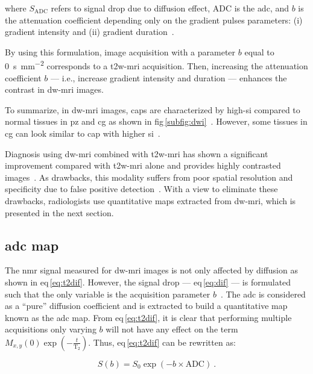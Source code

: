 \noindent where $S_{\text{ADC}}$ refers to signal drop due to diffusion effect,
$\text{ADC}$ is the \acl{adc}, and $b$ is the attenuation coefficient depending
only on the gradient pulses parameters: (i) gradient intensity and (ii)
gradient duration~\cite{LeBihan1986}.

By using this formulation, image acquisition with a parameter $b$ equal to
\SI{0}{\second\per\milli\metre\squared} corresponds to a \ac{t2w}-\ac{mri}
acquisition.
Then, increasing the attenuation coefficient $b$ --- i.e., increase gradient
intensity and duration --- enhances the contrast in \ac{dw}-\ac{mri} images.

To summarize, in \ac{dw}-\ac{mri} images, \acp{cap} are characterized by
high-\ac{si} compared to normal tissues in \ac{pz} and \ac{cg} as shown in
\acs{fig}\,\ref{subfig:dwi}~\cite{Barentsz2012}.
However, some tissues in \ac{cg} can look similar to \ac{cap} with higher
\ac{si}~\cite{Barentsz2012}.

Diagnosis using \ac{dw}-\ac{mri} combined with \ac{t2w}-\ac{mri} has shown a
significant improvement compared with \ac{t2w}-\ac{mri} alone and provides
highly contrasted images~\cite{Shimofusa2005,Padhani2011,Choi2007}.
As drawbacks, this modality suffers from poor spatial resolution and
specificity due to false positive detection~\cite{Choi2007}.
With a view to eliminate these drawbacks, radiologists use quantitative maps
extracted from \ac{dw}-\ac{mri}, which is presented in the next section.

\subsection{\acs*{adc} map}\label{subsec:chp2:imaging:adc}
The \ac{nmr} signal measured for \ac{dw}-\ac{mri} images is not only affected
by diffusion as shown in \acs{eq}\,\eqref{eq:t2dif}.
However, the signal drop --- \acs{eq}\,\eqref{eq:dif} --- is formulated such
that the only variable is the acquisition parameter $b$~\cite{LeBihan1986}.
The \ac{adc} is considered as a ``pure'' diffusion coefficient and is extracted
to build a quantitative map known as the \acs{adc} map.
From \acs{eq}\,\eqref{eq:t2dif}, it is clear that performing multiple
acquisitions only varying $b$ will not have any effect on the term  $M_{x,y}(0)
\exp \left( - \frac{t}{\text{T}_2} \right)$.
Thus, \acs{eq}\,\eqref{eq:t2dif} can be rewritten as:

\begin{equation}
  S(b) = S_0 \exp \left( -b \times \text{ADC} \right) \ .
  \label{eq:t2adcrew}
\end{equation}

